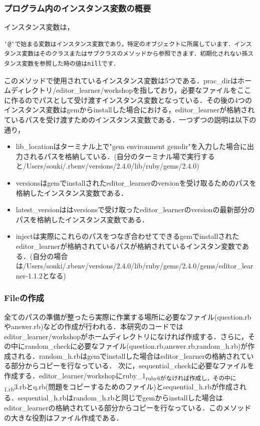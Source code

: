 \documentclass[11pt,dvipdfmx]{jsarticle}
\providecommand{\tightlist}{%
      \setlength{\itemsep}{0pt}\setlength{\parskip}{0pt}}
\begin{document}
\subsubsection{プログラム内のインスタンス変数の概要}\label{ux30d7ux30edux30b0ux30e9ux30e0ux5185ux306eux30a4ux30f3ux30b9ux30bfux30f3ux30b9ux5909ux6570ux306eux6982ux8981}

インスタンス変数は，

\begin{verbatim}
'@'で始まる変数はインスタンス変数であり，特定のオブジェクトに所属しています．インスタンス変数はそのクラスまたはサブクラスのメソッドから参照できます．初期化されない孫スタンス変数を参照した時の値はnillです．
\end{verbatim}

このメソッドで使用されているインスタンス変数は5つである．prac\_dirはホームディレクトリ/editor\_learner/workshopを指しており，必要なファイルをここに作るのでパスとして受け渡すインスタンス変数となっている．その後の4つのインスタンス変数はgemからinstallした場合における，editor\_learnerが格納されているパスを受け渡すためのインスタンス変数である．一つずつの説明は以下の通り，

\begin{itemize}
\tightlist
\item
  lib\_locationはターミナル上で"gem environment
  gemdir"を入力した場合に出力されるパスを格納している．(自分のターミナル場で実行すると/Users/souki/.rbenv/versions/2.4.0/lib/ruby/gems/2.4.0)
\item
  versionsはgemでinstallされたeditor\_learnerのversionを受け取るためのパスを格納したインスタンス変数である．
\item
  latest\_versionははversionsで受け取ったeditor\_learnerのversionの最新部分のパスを格納したインスタンス変数である．
\item
  injectは実際にこれらのパスをつなぎ合わせてできるgemでinstallされたeditor\_learnerが格納されているパスが格納されているインスタン変数である．(自分の場合は/Users/souki/.rbenv/versions/2.4.0/lib/ruby/gems/2.4.0/gems/editor\_learner-1.1.2となる)
\end{itemize}

\subsubsection{Fileの作成}\label{fileux306eux4f5cux6210}

全てのパスの準備が整ったら実際に作業する場所に必要なファイル(question.rbやanswer.rb)などの作成が行われる．本研究のコードではeditor\_learner/workshopがホームディレクトリになければ作成する．さらに，その中にrandom\_checkに必要なファイル(question.rb,answer.rb,random\_h.rb)が作成される．random\_h.rbはgemでinstallした場合はeditor\_learnerの格納されている部分からコピーを行なっている．
次に，sequential\_checkに必要なファイルを作成する．editor\_learner/workshopにruby\_1\textsubscript{ruby6がなければ作成し，その中に1.rb}3.rbとq.rb(問題をコピーするためのファイル)とsequential\_h.rbが作成される．sequential\_h.rbはrandom\_h.rbと同じでgemからinstallした場合はeditor\_learnerの格納されている部分からコピーを行なっている．このメソッドの大きな役割はファイル作成である．
\end{document}
